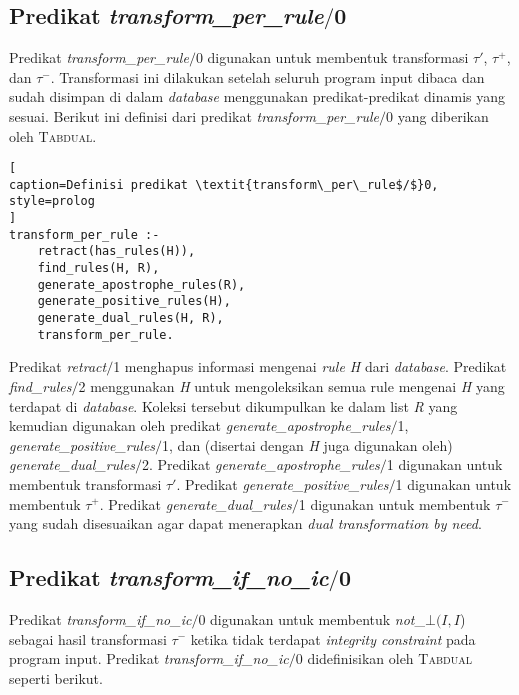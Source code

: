 \subsection{Predikat \textit{transform\_per\_rule$/$}0}

Predikat \textit{transform\_per\_rule$/$}0 digunakan untuk membentuk transformasi $\tau'$, $\tau^+$, dan $\tau^-$. Transformasi ini dilakukan setelah seluruh program input dibaca dan sudah disimpan di dalam \textit{database} menggunakan predikat-predikat dinamis yang sesuai. Berikut ini definisi dari predikat \textit{transform\_per\_rule$/$}0 yang diberikan oleh \textsc{Tabdual}.
\\

\begin{lstlisting}[
caption=Definisi predikat \textit{transform\_per\_rule$/$}0,
style=prolog
]
transform_per_rule :-
	retract(has_rules(H)),
	find_rules(H, R),
	generate_apostrophe_rules(R),
	generate_positive_rules(H),
	generate_dual_rules(H, R),
	transform_per_rule.
\end{lstlisting}

Predikat \textit{retract$/$}1 menghapus informasi mengenai \textit{rule H} dari \textit{database}. Predikat \textit{find\_rules$/$}2 menggunakan \textit{H} untuk mengoleksikan semua rule mengenai \textit{H} yang terdapat di \textit{database}. Koleksi tersebut dikumpulkan ke dalam list \textit{R} yang kemudian digunakan oleh predikat \textit{generate\_apostrophe\_rules$/$}1, \textit{generate\_positive\_rules$/$}1, dan (disertai dengan \textit{H} juga digunakan oleh) \textit{generate\_dual\_rules$/$}2. Predikat \textit{generate\_apostrophe\_rules$/$}1 digunakan untuk membentuk transformasi $\tau'$. Predikat \textit{generate\_positive\_rules$/$}1 digunakan untuk membentuk $\tau^+$. Predikat \textit{generate\_dual\_rules$/$}1 digunakan untuk membentuk $\tau^-$ yang sudah disesuaikan agar dapat menerapkan \textit{dual transformation by need}.

\subsection{Predikat \textit{transform\_if\_no\_ic$/$}0}

Predikat \textit{transform\_if\_no\_ic$/$}0 digunakan untuk membentuk \textit{not}\_$\bot(\textit{I},\textit{I}$) sebagai hasil transformasi $\tau^-$ ketika tidak terdapat \textit{integrity constraint} pada program input. Predikat \textit{transform\_if\_no\_ic$/$}0 didefinisikan oleh \textsc{Tabdual} seperti berikut.
\\

